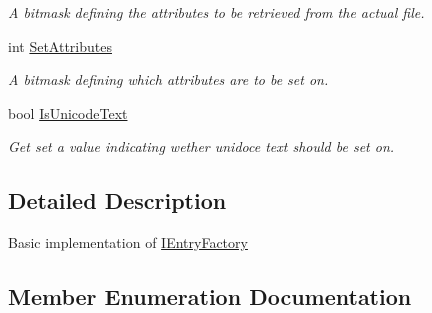 \begin{DoxyCompactItemize}
\begin{DoxyCompactList}\small\item\em A bitmask defining the attributes to be retrieved from the actual file. \end{DoxyCompactList}\item 
int \hyperlink{class_i_c_sharp_code_1_1_sharp_zip_lib_1_1_zip_1_1_zip_entry_factory_a58b911c224133732012e8c91ab403a2f}{Set\+Attributes}
\begin{DoxyCompactList}\small\item\em A bitmask defining which attributes are to be set on. \end{DoxyCompactList}\item 
bool \hyperlink{class_i_c_sharp_code_1_1_sharp_zip_lib_1_1_zip_1_1_zip_entry_factory_a38a51c9551bb282aba689ba4c35d724c}{Is\+Unicode\+Text}
\begin{DoxyCompactList}\small\item\em Get set a value indicating wether unidoce text should be set on. \end{DoxyCompactList}\end{DoxyCompactItemize}


\subsection{Detailed Description}
Basic implementation of \hyperlink{interface_i_c_sharp_code_1_1_sharp_zip_lib_1_1_zip_1_1_i_entry_factory}{I\+Entry\+Factory} 



\subsection{Member Enumeration Documentation}
\mbox{\label{class_i_c_sharp_code_1_1_sharp_zip_lib_1_1_zip_1_1_zip_entry_factory_a10d0f2a1e64abd09ea6abac4d34a9955}} 
